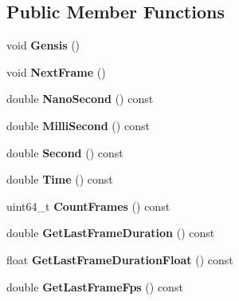 \subsection*{Public Member Functions}
\begin{DoxyCompactItemize}
\item 
\mbox{\label{classnabla_1_1_clock_ac012113bacfa7c7cf29bed862ea030bb}} 
void {\bfseries Gensis} ()
\item 
\mbox{\label{classnabla_1_1_clock_aac89ba34d390d6b95b1b3782df7abe1e}} 
void {\bfseries Next\+Frame} ()
\item 
\mbox{\label{classnabla_1_1_clock_a1d8c03a6cfc4b894f8da8b062a4f4939}} 
double {\bfseries Nano\+Second} () const
\item 
\mbox{\label{classnabla_1_1_clock_a7135d5706e4ac4cadc5bc2be6722a579}} 
double {\bfseries Milli\+Second} () const
\item 
\mbox{\label{classnabla_1_1_clock_a26be9b9647a19f82aadcd056962da988}} 
double {\bfseries Second} () const
\item 
\mbox{\label{classnabla_1_1_clock_aafaee63fe4999626a5aa0a48c1fef703}} 
double {\bfseries Time} () const
\item 
\mbox{\label{classnabla_1_1_clock_a83fb5b24c32e2e97afbebeb1116532fd}} 
uint64\+\_\+t {\bfseries Count\+Frames} () const
\item 
\mbox{\label{classnabla_1_1_clock_a796994d8702240cd37b6673bc56c3ee5}} 
double {\bfseries Get\+Last\+Frame\+Duration} () const
\item 
\mbox{\label{classnabla_1_1_clock_a86b717c004aa9c2564579793aabf0224}} 
float {\bfseries Get\+Last\+Frame\+Duration\+Float} () const
\item 
\mbox{\label{classnabla_1_1_clock_a474e40b10a0882583a28a31f841e17e7}} 
double {\bfseries Get\+Last\+Frame\+Fps} () const
\item 
\mbox{\label{classnabla_1_1_clock_ae4cdc3694fc102d6cc7c4748fc0eb76a}} 

\end{DoxyCompactItemize}
